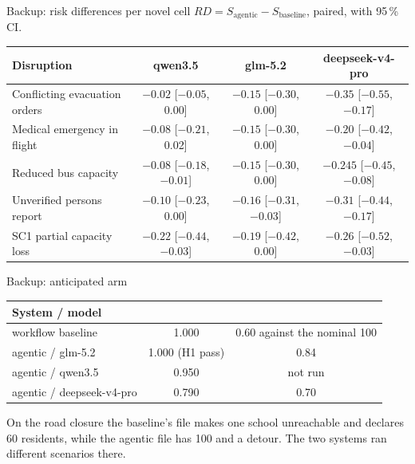 \documentclass[10pt,aspectratio=169]{beamer}
\newcommand{\code}[1]{\texttt{\detokenize{#1}}}
\begin{document}
\begin{frame}{Backup: risk differences per novel cell}
  \small
  $RD = S_\text{agentic} - S_\text{baseline}$, paired, with 95\,\% CI.
  \medskip

  \centering\footnotesize
  \begin{tabular}{lccc}
    \toprule
    Disruption & qwen3.5 & glm-5.2 & deepseek-v4-pro \\
    \midrule
    Conflicting evacuation orders & $-0.02$ [$-0.05$, 0.00] & $-0.15$ [$-0.30$, 0.00] & $-0.35$ [$-0.55$, $-0.17$] \\
    Medical emergency in flight & $-0.08$ [$-0.21$, 0.02] & $-0.15$ [$-0.30$, 0.00] & $-0.20$ [$-0.42$, $-0.04$] \\
    Reduced bus capacity & $-0.08$ [$-0.18$, $-0.01$] & $-0.15$ [$-0.30$, 0.00] & $-0.245$ [$-0.45$, $-0.08$] \\
    Unverified persons report & $-0.10$ [$-0.23$, 0.00] & $-0.16$ [$-0.31$, $-0.03$] & $-0.31$ [$-0.44$, $-0.17$] \\
    SC1 partial capacity loss & $-0.22$ [$-0.44$, $-0.03$] & $-0.19$ [$-0.42$, 0.00] & $-0.26$ [$-0.52$, $-0.03$] \\
    \bottomrule
  \end{tabular}
\end{frame}

\begin{frame}{Backup: anticipated arm}
  \centering
  \begin{tabular}{lcc}
    \toprule
    System / model & \code{closed_loop} & \code{road_closure} \\
    \midrule
    workflow baseline & 1.000 & 0.60 against the nominal 100 \\
    agentic / glm-5.2 & 1.000 (H1 pass) & 0.84 \\
    agentic / qwen3.5 & 0.950 & not run \\
    agentic / deepseek-v4-pro & 0.790 & 0.70 \\
    \bottomrule
  \end{tabular}
  \par\bigskip
  \raggedright\small
  On the road closure the baseline's file makes one school unreachable and
  declares 60 residents, while the agentic file has 100 and a detour. The two
  systems ran different scenarios there.
\end{frame}
\end{document}
